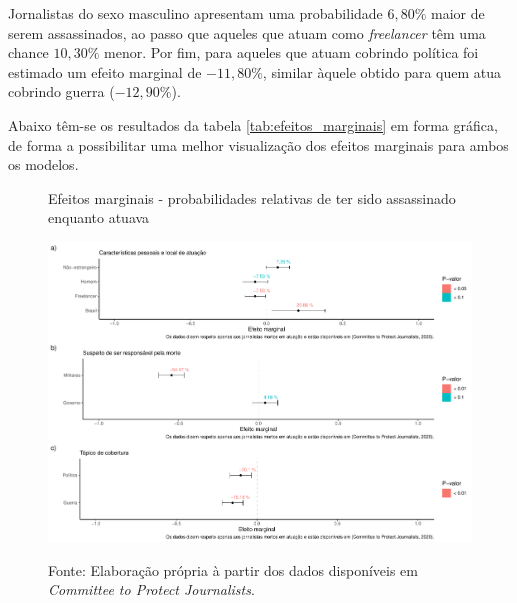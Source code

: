 \documentclass[12pt,
               openright,
               oneside,
               a4paper,
							 section=TITLE,     %
               subsection=Title,  %
               english,brazil]{article}
\begin{document}
Jornalistas do sexo masculino apresentam uma probabilidade $6,80\%$ maior de serem assassinados, ao passo que aqueles que atuam como \textit{freelancer} têm uma chance $10,30\%$ menor. Por fim, para aqueles que atuam cobrindo política foi estimado um efeito marginal de $-11,80\%$, similar àquele obtido para quem atua cobrindo guerra ($-12,90\%$).

Abaixo têm-se os resultados da tabela \ref{tab:efeitos_marginais} em forma gráfica, de forma a possibilitar uma melhor visualização dos efeitos marginais para ambos os modelos.

\begin{figure}[H]
	\centering
	\caption{Efeitos marginais - probabilidades relativas de ter sido assassinado enquanto atuava}
	\label{fig:efeitos_marginais}
	\includegraphics[width=\linewidth]{"Figuras/efeitos_marginais.pdf"} \\
\caption*{Fonte: Elaboração própria à partir dos dados disponíveis em \textit{Committee to Protect Journalists}.}
\end{figure}
\end{document}
